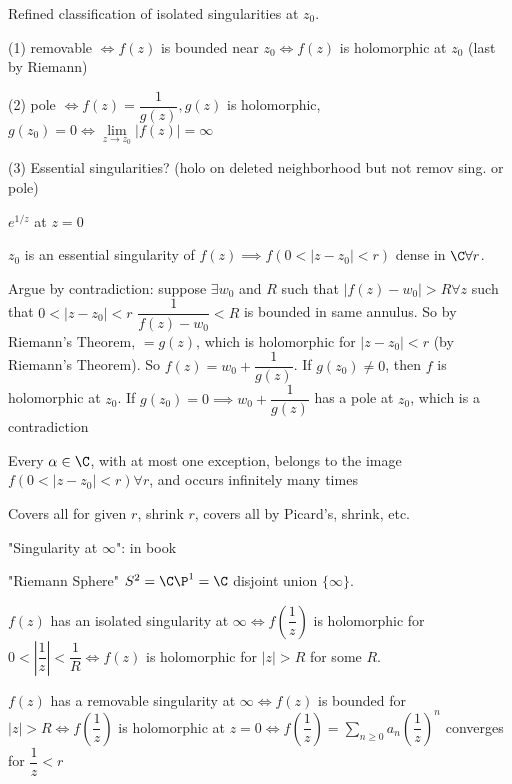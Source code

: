\documentclass[twoside, 10pt]{article}
\begin{document}
\begin{defn}
   Refined classification of isolated singularities at $z_0$.
\end{defn}
(1) removable $\iff f(z)$ is bounded near $z_0 \iff f(z)$ is holomorphic at $z_0$ (last by Riemann)

(2) pole $\iff f(z) = \dfrac{1}{g(z)}, g(z)$ is holomorphic, $g(z_0) = 0 \iff \lim\limits_{z\to z_0}|f(z)| = \infty$

(3) Essential singularities? (holo on deleted neighborhood but not remov sing. or pole)

\begin{exm}
   $e^{1/z}$ at $z=0$
\end{exm}

\begin{thm}
   $z_0$ is an essential singularity of $f(z) \implies f(0 < |z-z_0| < r)$ dense in $\C \forall r$. 
\end{thm}

Argue by contradiction: suppose $\exists w_0$ and $R$ such that $|f(z) - w_0| > R \forall z$ such that $0 < |z-z_0| < r$ %
$\dfrac{1}{f(z)-w_0} < R$ is bounded in same annulus. So by Riemann's Theorem, $=g(z)$, which is holomorphic for $|z-z_0| < r$ (by Riemann's Theorem). So $f(z) = w_0 + \dfrac{1}{g(z)}$. If $g(z_0) \neq 0$, then $f$ is holomorphic at $z_0$. If $g(z_0) = 0 \implies w_0 + \dfrac{1}{g(z)}$ has a pole at $z_0$, which is a contradiction %

\begin{thm}
   Every $\alpha \in \C$, with at most one exception, belongs to the image $f(0 < |z-z_0| < r) \forall r$, and occurs infinitely many times
\end{thm}
Covers all for given $r$, shrink $r$, covers all by Picard's, shrink, etc.

"Singularity at $\infty$": in book

"Riemann Sphere" $S^2 = \C \P^1 = \C$ disjoint union $\{\infty\}$.

$f(z)$ has an isolated singularity at $\infty \iff f(\dfrac{1}{z})$ is holomorphic for $0 < \left|\dfrac{1}{z}\right| < \dfrac{1}{R} \iff f(z)$ is holomorphic for $|z| > R$ for some $R$.

$f(z)$ has a removable singularity at $\infty \iff f(z)$ is bounded for $|z| > R \iff f(\dfrac{1}{z})$ is holomorphic at $z=0 \iff f(\dfrac{1}{z}) = \sum\limits_{n\geq 0}a_n\left(\dfrac{1}{z}\right)^n$ converges for $\dfrac{1}{z} < r$
\end{document}
